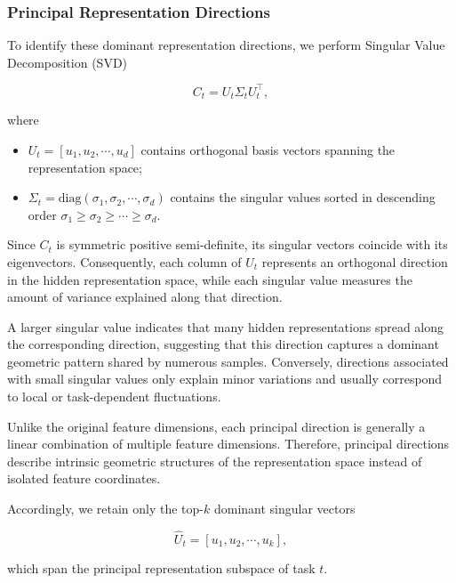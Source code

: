 \documentclass[a4paper]{article}
\begin{document}
\subsubsection{Principal Representation Directions}

To identify these dominant representation directions, we perform Singular Value Decomposition (SVD)

\begin{equation}
C_t
=
U_t
\Sigma_t
U_t^{\top},
\end{equation}

where

\begin{itemize}
\item
$U_t=[u_1,u_2,\cdots,u_d]$
contains orthogonal basis vectors spanning the representation space;

\item
$\Sigma_t=\mathrm{diag}(\sigma_1,\sigma_2,\cdots,\sigma_d)$
contains the singular values sorted in descending order
\(
\sigma_1\ge\sigma_2\ge\cdots\ge\sigma_d.
\)
\end{itemize}

Since $C_t$ is symmetric positive semi-definite, its singular vectors coincide with its eigenvectors. Consequently, each column of $U_t$ represents an orthogonal direction in the hidden representation space, while each singular value measures the amount of variance explained along that direction.

A larger singular value indicates that many hidden representations spread along the corresponding direction, suggesting that this direction captures a dominant geometric pattern shared by numerous samples. Conversely, directions associated with small singular values only explain minor variations and usually correspond to local or task-dependent fluctuations.

Unlike the original feature dimensions, each principal direction is generally a linear combination of multiple feature dimensions. Therefore, principal directions describe intrinsic geometric structures of the representation space instead of isolated feature coordinates.

Accordingly, we retain only the top-$k$ dominant singular vectors

\begin{equation}
\hat U_t
=
[u_1,u_2,\cdots,u_k],
\end{equation}

which span the principal representation subspace of task $t$.
\end{document}
